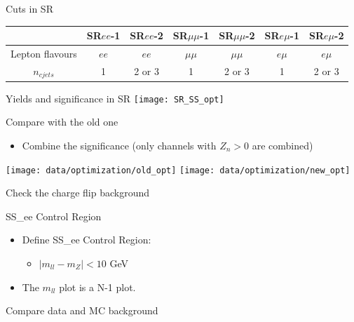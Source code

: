 \documentclass[mathserif,serif]{beamer}
\begin{document}
\begin{frame}{Cuts in SR}
\vspace{5mm}
\tiny
\begin{tabular}{|c|c|c|c|c|c|c|}
\hline
& SR$ee$-1 & SR$ee$-2 & SR$\mu\mu$-1 & SR$\mu\mu$-2 & SR$e\mu$-1 & SR$e\mu$-2 \\
\hline
Lepton flavours & $ee$ & $ee$ & $\mu\mu$ & $\mu\mu$ & $e\mu$ & $e\mu$ \\
\hline
$n_{cjets}$ & 1 & 2 or 3 & 1 & 2 or 3 & 1 & 2 or 3 \\
\hline

\end{tabular}
\end{frame}

\begin{frame}{Yields and significance in SR}
\texttt{[image: SR\_SS\_opt]}
\end{frame}




\begin{frame}{Compare with the old one}
\begin{itemize}
\item Combine the significance (only channels with $Z_n>0$ are combined)
\end{itemize}
\texttt{[image: data/optimization/old\_opt]}
\texttt{[image: data/optimization/new\_opt]}
\end{frame}

\begin{frame}
\begin{center}
\huge
Check the charge flip background
\end{center}
\end{frame}

\begin{frame}{SS\_ee Control Region}
\begin{itemize}
\item Define SS\_ee Control Region:
\begin{itemize}
\item $|m_{ll}-m_Z| < 10$ GeV
\end{itemize}
\item The $m_{ll}$ plot is a N-1 plot.
\end{itemize}
\end{frame}

\begin{frame}
\begin{center}
\huge
Compare data and MC background
\end{center}
\end{frame}
\end{document}
